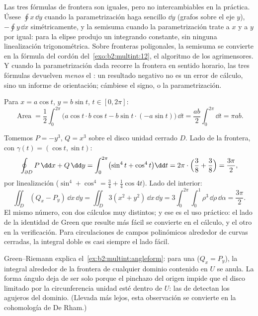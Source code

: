 \begin{remark}
Las tres fórmulas de frontera son iguales, pero no intercambiables en
la práctica. Úsese $\oint x\,\dd y$ cuando la parametrización haga
sencillo $\dd y$ (grafos sobre el eje $y$), $-\oint y\,\dd x$
simétricamente, y la semisuma  cuando la parametrización
trate a $x$ y a $y$ por igual: para la elipse produjo un integrando
constante, sin ninguna linealización trigonométrica. Sobre fronteras
poligonales, la semisuma se convierte en la fórmula del cordón del~\cref{exo:b2:multint:12}, el algoritmo de los agrimensores. Y cuando
la parametrización dada recorre la frontera en sentido horario, las
tres fórmulas devuelven \emph{menos} el : un resultado negativo
no es un error de cálculo, sino un informe de orientación; cámbiese
el signo, o la parametrización.
\end{remark}

\begin{example}\label{ex:b2:multint:ellipsearea}
Para $x = a\cos t$, $y = b\sin t$, $t \in [0, 2\pi]$:
\[
\operatorname{Area}
= \frac12\int_0^{2\pi}\bigl(a\cos t \cdot b\cos t
- b\sin t\cdot(-a\sin t)\bigr)\,\dd t
= \frac{ab}{2}\int_0^{2\pi}\dd t = \pi ab .
\]
\end{example}

\begin{example}\label{ex:b2:multint:greencheck}
Tomemos $P = -y^3$, $Q = x^3$ sobre el disco unidad cerrado $D$. Lado
de la frontera, con $\gamma(t) = (\cos t, \sin t)$:
\[
\oint_{\partial D}P\,\dd x + Q\,\dd y
= \int_0^{2\pi}\bigl(\sin^4 t + \cos^4 t\bigr)\dd t
= 2\pi\cdot\Bigl(\frac38 + \frac38\Bigr) = \frac{3\pi}2 ,
\]
por linealización ($\sin^4 + \cos^4 = \tfrac34 + \tfrac14\cos4t$).
Lado del interior:
\[
\iint_D(Q_x - P_y)\,\dd x\,\dd y
= \iint_D 3(x^2 + y^2)\,\dd x\,\dd y
= 3\int_0^{2\pi}\!\!\int_0^1\rho^3\,\dd\rho\,\dd\alpha
= \frac{3\pi}2 .
\]
El mismo número, con dos cálculos muy distintos; y ese es el uso
práctico: el lado de la identidad de Green que resulte más fácil se
convierte en el cálculo, y el otro en la verificación. Para
circulaciones de campos polinómicos alrededor de curvas cerradas, la
integral doble es casi siempre el lado fácil.
\end{example}

\begin{remark}
Green--Riemann explica el~\cref{ex:b2:multint:angleform}: para una
 ($Q_x = P_y$), la integral alrededor de la frontera de
cualquier dominio contenido en $U$ se anula. La forma ángulo deja de
ser  solo porque el pinchazo del origen impide que el disco
limitado por la circunferencia unidad esté dentro de $U$: las
 de  detectan los agujeros del
dominio. (Llevada más lejos, esta observación se convierte en la
cohomología de De Rham.)
\end{remark}


